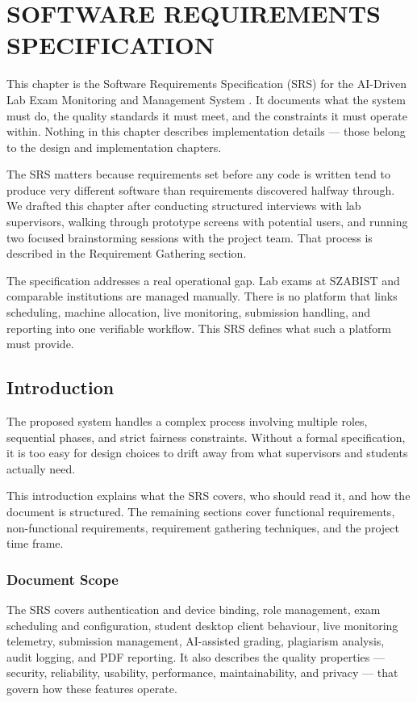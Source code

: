 \chapter{SOFTWARE REQUIREMENTS SPECIFICATION}
\label{chap:srs}

This chapter is the Software Requirements Specification (SRS) for the AI-Driven Lab Exam Monitoring and Management System \cite{srs1}. It documents what the system must do, the quality standards it must meet, and the constraints it must operate within. Nothing in this chapter describes implementation details — those belong to the design and implementation chapters.

The SRS matters because requirements set before any code is written tend to produce very different software than requirements discovered halfway through. We drafted this chapter after conducting structured interviews with lab supervisors, walking through prototype screens with potential users, and running two focused brainstorming sessions with the project team. That process is described in the Requirement Gathering section.

The specification addresses a real operational gap. Lab exams at SZABIST and comparable institutions are managed manually. There is no platform that links scheduling, machine allocation, live monitoring, submission handling, and reporting into one verifiable workflow. This SRS defines what such a platform must provide.

\section{Introduction}

The proposed system handles a complex process involving multiple roles, sequential phases, and strict fairness constraints. Without a formal specification, it is too easy for design choices to drift away from what supervisors and students actually need.

This introduction explains what the SRS covers, who should read it, and how the document is structured. The remaining sections cover functional requirements, non-functional requirements, requirement gathering techniques, and the project time frame.

\subsection{Document Scope}

The SRS covers authentication and device binding, role management, exam scheduling and configuration, student desktop client behaviour, live monitoring telemetry, submission management, AI-assisted grading, plagiarism analysis, audit logging, and PDF reporting. It also describes the quality properties — security, reliability, usability, performance, maintainability, and privacy — that govern how these features operate.

